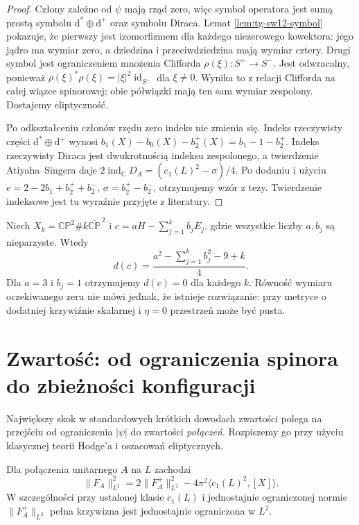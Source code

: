 \begin{proof}
Człony zależne od $\psi$ mają rząd zero, więc symbol
operatora jest sumą prostą symbolu
$\mathrm d^*\oplus\mathrm d^+$ oraz symbolu Diraca.
Lemat \ref{lem:tg-sw12-symbol} pokazuje, że pierwszy jest
izomorfizmem dla każdego niezerowego kowektora: jego jądro
ma wymiar zero, a dziedzina i przeciwdziedzina mają
wymiar cztery. Drugi symbol jest ograniczeniem mnożenia Clifforda
$\rho(\xi)\colon S^+\to S^-$. Jest odwracalny,
ponieważ $\rho(\xi)^*\rho(\xi)=
|\xi|^2\operatorname{id}_{S^+}$ dla $\xi\ne0$.
Wynika to z relacji Clifforda na całej wiązce spinorowej;
obie półwiązki mają ten sam wymiar zespolony.
Dostajemy eliptyczność.

Po odkształceniu członów rzędu zero indeks nie zmienia
się. Indeks rzeczywisty części $\mathrm d^*\oplus\mathrm d^+$
wynosi $b_1(X)-b_0(X)-b_2^+(X)=b_1-1-b_2^+$.
Indeks rzeczywisty Diraca jest dwukrotnością indeksu
zespolonego, a twierdzenie Atiyaha--Singera daje
$2\operatorname{ind}_\mathbb C D_A=(c_1(L)^2-\sigma)/4$.
Po dodaniu i użyciu $e=2-2b_1+b_2^++b_2^-$,
$\sigma=b_2^+-b_2^-$, otrzymujemy wzór z tezy.
Twierdzenie indeksowe jest tu wyraźnie przyjęte z literatury.
\end{proof}

\begin{przyklad}
Niech $X_k=\mathbb{CP}^2\#k\overline{\mathbb{CP}}^{\,2}$
i $c=aH-\sum_{j=1}^k b_jE_j$, gdzie wszystkie liczby
$a,b_j$ są nieparzyste. Wtedy
\[
d(c)=\frac{a^2-\sum_{j=1}^k b_j^2-9+k}{4}.
\]
Dla $a=3$ i $b_j=1$ otrzymujemy $d(c)=0$ dla każdego $k$.
Równość wymiaru oczekiwanego zeru nie mówi jednak,
że istnieje rozwiązanie: przy metryce o dodatniej
krzywiźnie skalarnej i $\eta=0$ przestrzeń może być pusta.
\end{przyklad}

\section{Zwartość: od ograniczenia spinora do zbieżności konfiguracji}
\label{sec:tg-sw12-compact}

Największy skok w standardowych krótkich dowodach
zwartości polega na przejściu od ograniczenia $|\psi|$
do zwartości \emph{połączeń}. Rozpiszemy go przy użyciu
klasycznej teorii Hodge'a i oszacowań eliptycznych.

\begin{lemat}
\label{lem:tg-sw12-curvature}
Dla połączenia unitarnego $A$ na $L$ zachodzi
\[
\|F_A\|_{L^2}^2=2\|F_A^+\|_{L^2}^2
-4\pi^2\langle c_1(L)^2,[X]\rangle.
\]
W szczególności przy ustalonej klasie $c_1(L)$
i jednostajnie ograniczonej normie $\|F_A^+\|_{L^2}$
pełna krzywizna jest jednostajnie ograniczona w $L^2$.
\end{lemat}

